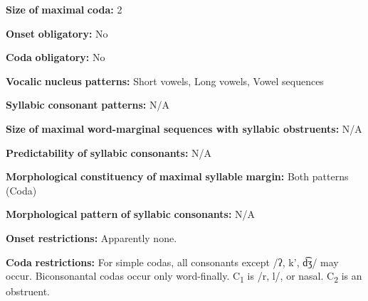\begin{styleBody}
\textbf{Size} \textbf{of} \textbf{maximal} \textbf{coda:} 2
\end{styleBody}

\begin{styleBody}
\textbf{Onset} \textbf{obligatory:} No
\end{styleBody}

\begin{styleBody}
\textbf{Coda} \textbf{obligatory:} No
\end{styleBody}

\begin{styleBody}
\textbf{Vocalic} \textbf{nucleus} \textbf{patterns:} Short vowels, Long vowels, Vowel sequences
\end{styleBody}

\begin{styleBody}
\textbf{Syllabic} \textbf{consonant} \textbf{patterns:} N/A
\end{styleBody}

\begin{styleBody}
\textbf{Size} \textbf{of} \textbf{maximal} \textbf{word{}-marginal sequences with syllabic obstruents:} N/A
\end{styleBody}

\begin{styleBody}
\textbf{Predictability} \textbf{of} \textbf{syllabic} \textbf{consonants:} N/A
\end{styleBody}

\begin{styleBody}
\textbf{Morphological} \textbf{constituency} \textbf{of} \textbf{maximal} \textbf{syllable} \textbf{margin:} Both patterns (Coda)
\end{styleBody}

\begin{styleBody}
\textbf{Morphological} \textbf{pattern} \textbf{of} \textbf{syllabic} \textbf{consonants:} N/A
\end{styleBody}

\begin{styleBody}
\textbf{Onset} \textbf{restrictions:} Apparently none.
\end{styleBody}

\begin{styleBody}
\textbf{Coda} \textbf{restrictions:} For simple codas, all consonants except /ʔ, k’, d͡ʒ/ may occur. Biconsonantal codas occur only word-finally. C\textsubscript{1} is /r, l/, or nasal. C\textsubscript{2} is an obstruent.
\end{styleBody}

